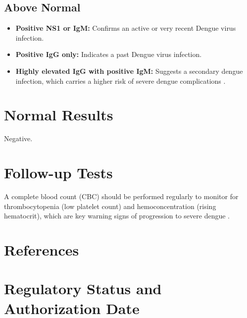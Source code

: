 \subsection*{Above Normal}
\begin{itemize}
  \item \textbf{Positive NS1 or IgM:} Confirms an active or very recent Dengue virus infection.
  \item \textbf{Positive IgG only:} Indicates a past Dengue virus infection.
  \item \textbf{Highly elevated IgG with positive IgM:} Suggests a secondary dengue infection, which carries a higher risk of severe dengue complications \cite{simmons2012dengue}.
\end{itemize}

\section*{Normal Results}
Negative.

\section*{Follow-up Tests}
A complete blood count (CBC) should be performed regularly to monitor for thrombocytopenia (low platelet count) and hemoconcentration (rising hematocrit), which are key warning signs of progression to severe dengue \cite{cdc2023dengue}.

\section*{References}



\clearpage
\section*{Regulatory Status and Authorization Date}

\clearpage
